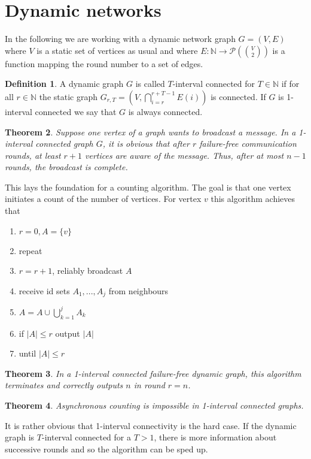 \documentclass[a4paper, 12pt]{article}
\theoremstyle{plain}
\newtheorem{theorem}{Theorem}[section] %
\theoremstyle{definition}
\newtheorem{definition}[theorem]{Definition} %
\theoremstyle{lemma}
\theoremstyle{remark}
\theoremstyle{corollary}
\theoremstyle{example}
\begin{document}
	\section{Dynamic networks}
	In the following we are working with a dynamic network graph $G=(V,E)$ where $V$ is a static set of vertices as usual and where $E: \mathbb{N} \to \mathcal{P}\left(\binom{V}{2}\right)$ is a function mapping the round number to a set of edges. 
	\begin{definition}
		A dynamic graph $G$ is called $T$-interval connected for $T \in \mathbb{N}$ if for all $r\in \mathbb{N}$ the static graph $G_{r,T} = \left(V, \bigcap_{i=r}^{r+T-1} E(i)\right)$ is connected. If $G$ is 1-interval connected we say that $G$ is always connected.
	\end{definition}
	\begin{theorem}
		Suppose one vertex of a graph wants to broadcast a message. In a 1-interval connected graph $G$, it is obvious that after $r$ failure-free communication rounds, at least $r+1$ vertices are aware of the message. Thus, after at most $n-1$ rounds, the broadcast is complete.
	\end{theorem}
	This lays the foundation for a counting algorithm. The goal is that one vertex initiates a count of the number of vertices. For vertex $v$ this algorithm achieves that
	\begin{enumerate}
		\item $r=0, A = \{v\}$
		\item repeat
		\item $r=r+1$, reliably broadcast $A$
		\item receive id sets $A_1,...,A_j$ from neighbours
		\item $A = A \cup \bigcup_{k=1}^j A_k$
		\item if $\left|A\right| \leq r$ output $\left|A\right|$
		\item until $\left|A\right| \leq r$
	\end{enumerate}
	\begin{theorem}
		In a 1-interval connected failure-free dynamic graph, this algorithm terminates and correctly outputs $n$ in round $r=n$.
	\end{theorem}
	\begin{theorem}
		Asynchronous counting is impossible in 1-interval connected graphs.
	\end{theorem}
	It is rather obvious that 1-interval connectivity is the hard case. If the dynamic graph is $T$-interval connected for a $T>1$, there is more information about successive rounds and so the algorithm can be sped up.\\
\end{document}
